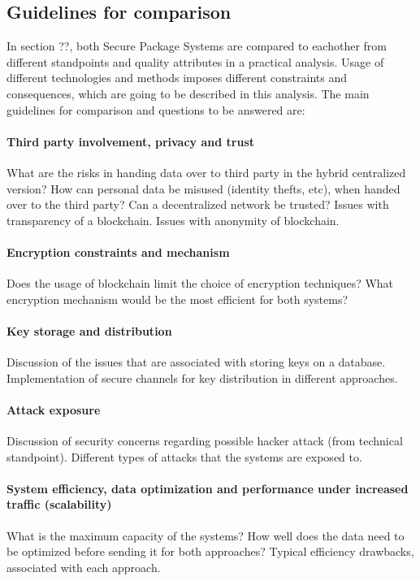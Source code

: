 \subsection{Guidelines for comparison} \label{section:guidelinesforcomparison}
In section ??, both Secure Package Systems are compared to eachother from different standpoints and quality attributes in a practical analysis. Usage of different technologies and methods imposes different constraints and consequences, which are going to be described in this analysis. The main guidelines for comparison and questions to be answered are:

\paragraph{Third party involvement, privacy and trust} 
What are the risks in handing data over to third party in the hybrid centralized version? How can personal data be misused (identity thefts, etc), when handed over to the third party? Can a decentralized network be trusted? Issues with transparency of a blockchain. Issues with anonymity of blockchain.

\paragraph{Encryption constraints and mechanism} 
Does the usage of blockchain limit the choice of encryption techniques? What encryption mechanism would be the most efficient for both systems?

\paragraph{Key storage and distribution} 
Discussion of the issues that are associated with storing keys on a database. Implementation of secure channels for key distribution in different approaches.

\paragraph{Attack exposure} 
Discussion of security concerns regarding possible hacker attack (from technical standpoint). Different types of attacks that the systems are exposed to.

\paragraph{System efficiency, data optimization and performance under increased traffic (scalability)} 
What is the maximum capacity of the systems? How well does the data need to be optimized before sending it for both approaches? Typical efficiency drawbacks, associated with each approach.

